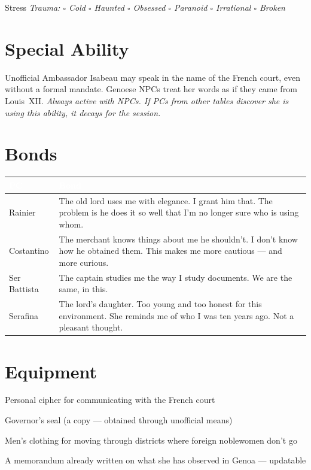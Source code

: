 \medskip
\begin{pgclockbox}{Stress \hfill {}}
\small\textit{Trauma: $\square$ Cold \quad $\square$ Haunted \quad $\square$ Obsessed \quad $\square$ Paranoid \quad $\square$ Irrational \quad $\square$ Broken}
\end{pgclockbox}

\section*{Special Ability}
\begin{grimaldibox}{Unofficial Ambassador}
Isabeau may speak in the name of the French court, even without a formal mandate.
Genoese NPCs treat her words as if they came from Louis~XII.
\textit{Always active with NPCs. If PCs from other tables discover she is using
this ability, it decays for the session.}
\end{grimaldibox}

\section*{Bonds}
\begin{table}[h]\centering\renewcommand{\arraystretch}{1.4}
\begin{tabularx}{\linewidth}{@{}L{2.6cm} X@{}}
\toprule{}
\textcolor{white}{\textbf{PC}} & \textcolor{white}{\textbf{Bond}} \\
\midrule
Rainier & The old lord uses me with elegance. I grant him that. The problem is he does it so well that I'm no longer sure who is using whom. \\
Costantino & The merchant knows things about me he shouldn't. I don't know how he obtained them. This makes me more cautious --- and more curious. \\
Ser Battista & The captain studies me the way I study documents. We are the same, in this. \\
Serafina & The lord's daughter. Too young and too honest for this environment. She reminds me of who I was ten years ago. Not a pleasant thought. \\
\bottomrule
\end{tabularx}
\end{table}

\section*{Equipment}
\begin{goldlist}
\item Personal cipher for communicating with the French court
\item Governor's seal (a copy --- obtained through unofficial means)
\item Men's clothing for moving through districts where foreign noblewomen don't go
\item A memorandum already written on what she has observed in Genoa --- updatable
\end{goldlist}

